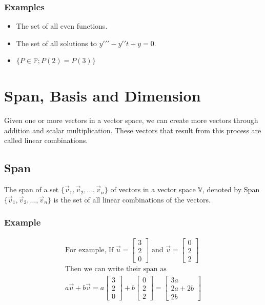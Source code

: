         \subsubsection{Examples}
        \begin{itemize}
        \item The set of all even functions.
        \item The set of all solutions to $y\prime\prime\prime - y\prime\prime t + y = 0$.
        \item $\{P \in \mathbb{P}; P(2) = P(3)\}$
        \end{itemize}

\section{Span, Basis and Dimension}
Given one or more vectors in a vector space, we can create more vectors through addition and scalar multiplication. These vectors that result from this process are called linear combinations.

    \subsection{Span}
    The span of a set $\{\vec{v}_1, \vec{v}_2, \ldots, \vec{v}_n\}$ of vectors in a vector space $\mathbb{V}$, denoted by Span$\{\vec{v}_1, \vec{v}_2, \ldots, \vec{v}_n\}$ is the set of all linear combinations of the vectors.

        \subsubsection{Example}
    \[
        \begin{aligned}
            \text{For example, If } \vec{u} = \left[ \begin{array}{c} 3\\2\\0 \end{array} \right] \text{ and } \vec{v} = \left[ \begin{array}{c} 0\\2\\2 \end{array} \right]\\
            \text{Then we can write their span as }\\
            a\vec{u} + b\vec{v} = a\left[ \begin{array}{c} 3\\2\\0 \end{array} \right] + b\left[ \begin{array}{c} 0\\2\\2 \end{array} \right] = \left[ \begin{array}{c} 3a\\2a+2b\\2b \end{array} \right]
        \end{aligned}
    \]

